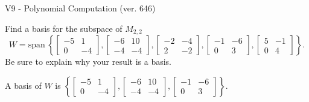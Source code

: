 \begin{exercise}
  \begin{exerciseTitle}V9 - Polynomial Computation (ver. 646)\end{exerciseTitle}
  \begin{exerciseStatement}
    Find a basis for the subspace of \(M_{2,2}\) 
\[W=\mathrm{span}\ \left\{\left[\begin{array}{cc}
-5 & 1 \\
0 & -4
\end{array}\right] , \left[\begin{array}{cc}
-6 & 10 \\
-4 & -4
\end{array}\right] , \left[\begin{array}{cc}
-2 & -4 \\
2 & -2
\end{array}\right] , \left[\begin{array}{cc}
-1 & -6 \\
0 & 3
\end{array}\right] , \left[\begin{array}{cc}
5 & -1 \\
0 & 4
\end{array}\right]\right\}.\]
 Be sure to explain why your result is a basis.


  \end{exerciseStatement}
  \begin{exerciseAnswer}
   A basis of \(W\) is  \(\left\{\left[\begin{array}{cc}
-5 & 1 \\
0 & -4
\end{array}\right] , \left[\begin{array}{cc}
-6 & 10 \\
-4 & -4
\end{array}\right] , \left[\begin{array}{cc}
-1 & -6 \\
0 & 3
\end{array}\right]\right\}\).
  


  \end{exerciseAnswer}
\end{exercise}